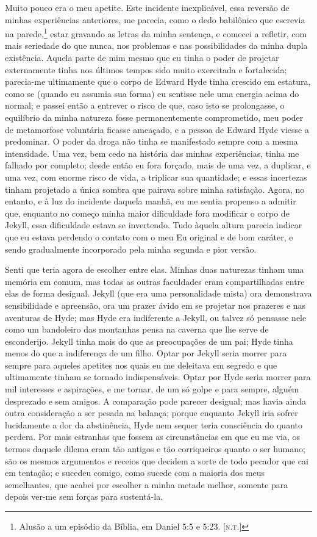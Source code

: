 Muito pouco era o meu apetite.  Este incidente inexplicável, essa
reversão de minhas experiências anteriores, me parecia, como o dedo
babilônico que escrevia na parede,\footnote{ Alusão a um episódio da
Bíblia, em Daniel 5:5 e 5:23. [\textsc{n.t.}]} estar gravando
as letras da minha sentença, e comecei a refletir, com mais seriedade
do que nunca, nos problemas  e nas possibilidades da minha dupla
existência.  Aquela parte de mim mesmo que eu tinha o poder de projetar
externamente tinha nos últimos tempos sido muito exercitada e
fortalecida; parecia-me ultimamente que o corpo de Edward Hyde tinha
crescido em estatura, como se (quando eu assumia sua forma) eu sentisse
nele uma energia acima do normal; e passei então a entrever o risco de
que, caso isto se prolongasse, o equilíbrio da minha natureza fosse
permanentemente comprometido, meu poder de metamorfose voluntária
ficasse ameaçado, e a pessoa de Edward Hyde viesse a predominar.  O
poder da droga não tinha se manifestado sempre com a mesma intensidade.
 Uma vez, bem cedo na história das minhas experiências, tinha me
falhado por completo; desde então eu fora forçado, mais de uma vez, a
duplicar, e uma vez, com enorme risco de vida, a triplicar sua
quantidade; e essas incertezas tinham projetado a única sombra que
pairava sobre minha satisfação.  Agora, no entanto, e à luz do
incidente daquela manhã, eu me sentia propenso a admitir que, enquanto
no começo minha maior dificuldade fora modificar o corpo de Jekyll,
essa dificuldade estava se invertendo.  Tudo àquela altura parecia
indicar que eu estava perdendo o contato com o meu Eu original e de bom
caráter, e sendo gradualmente incorporado pela minha segunda e pior
versão.

Senti que teria agora de escolher entre elas.  Minhas duas naturezas
tinham uma memória em comum, mas todas as outras faculdades eram
compartilhadas entre elas de forma desigual.  Jekyll (que era uma
personalidade mista) ora demonstrava sensibilidade e apreensão, ora um
prazer ávido em se projetar nos prazeres e nas aventuras de Hyde; mas
Hyde era indiferente a Jekyll, ou talvez só pensasse nele como um
bandoleiro das montanhas pensa na caverna que lhe serve de esconderijo.
 Jekyll tinha mais do que as preocupações de um pai; Hyde tinha menos
do que a indiferença de um filho.  Optar por Jekyll seria morrer para
sempre para aqueles apetites nos quais eu me deleitava em segredo e que
ultimamente tinham se tornado indispensáveis.  Optar por Hyde seria
morrer para mil interesses e aspirações, e me tornar, de um só golpe e
para sempre, alguém desprezado e sem amigos.  A comparação pode parecer
desigual; mas havia ainda outra consideração a ser pesada na balança;
porque enquanto Jekyll iria sofrer lucidamente a dor da abstinência,
Hyde nem sequer teria consciência do quanto perdera.  Por mais
estranhas que fossem as circunstâncias em que eu me via, os termos
daquele dilema eram tão antigos e tão corriqueiros quanto o ser humano;
são os mesmos argumentos e receios que decidem a sorte de todo pecador
que cai em tentação; e sucedeu comigo, como sucede com a maioria dos
meus semelhantes, que acabei por escolher a minha metade melhor,
somente para depois ver-me sem forças para sustentá-la. 

